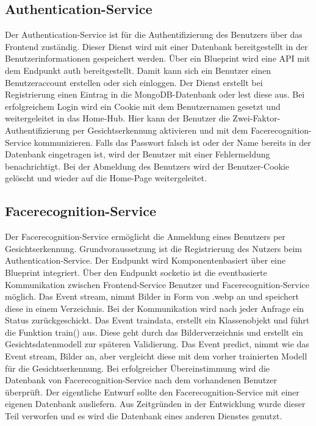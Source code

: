\subsection{Authentication-Service}
Der Authentication-Service ist für die Authentifizierung des Benutzers über das Frontend zuständig.
Dieser Dienst wird mit einer Datenbank bereitgestellt in der Benutzerinformationen gespeichert werden.
Über ein Blueprint wird eine API mit dem Endpunkt auth bereitgestellt.
Damit kann sich ein Benutzer einen Benutzeraccount erstellen oder sich einloggen.
Der Dienst erstellt bei Registrierung einen Eintrag in die MongoDB-Datenbank oder lest diese aus.
Bei erfolgreichem Login wird ein Cookie mit dem Benutzernamen gesetzt und weitergeleitet in das Home-Hub.
Hier kann der Benutzer die Zwei-Faktor-Authentifizierung per Gesichtserkennung aktivieren und mit dem Facerecognition-Service kommunizieren.
Falls das Passwort falsch ist oder der Name bereits in der Datenbank eingetragen ist, wird der Benutzer mit einer Fehlermeldung benachrichtigt.
Bei der Abmeldung des Benutzers wird der Benutzer-Cookie gelöscht und wieder auf die Home-Page weitergeleitet.


\subsection{Facerecognition-Service}
Der Facerecognition-Service ermöglicht die Anmeldung eines Benutzers per Gesichtserkennung.
Grundvoraussetzung ist die Registrierung des Nutzers beim Authentication-Service.
Der Endpunkt wird Komponentenbasiert über eine Blueprint integriert.
Über den Endpunkt socketio ist die eventbasierte Kommunikation zwischen Frontend-Service Benutzer und Facerecognition-Service möglich.
Das Event stream, nimmt Bilder in Form von .webp an und speichert diese in einem Verzeichnis.
Bei der Kommunikation wird nach jeder Anfrage ein Status zurückgeschickt.
Das Event traindata, erstellt ein Klassenobjekt und führt die Funktion train() aus.
Diese geht durch das Bilderverzeichnis und erstellt ein Gesichtsdatenmodell zur späteren Validierung.
Das Event predict, nimmt wie das Event stream, Bilder an, aber vergleicht diese mit dem vorher trainierten Modell für die Gesichtserkennung.
Bei erfolgreicher Übereinstimmung wird die Datenbank von Facerecognition-Service nach dem vorhandenen Benutzer überprüft.
Der eigentliche Entwurf sollte den Facerecognition-Service mit einer eigenen Datenbank ausliefern.
Aus Zeitgründen in der Entwicklung wurde dieser Teil verworfen und es wird die Datenbank eines anderen Dienstes genutzt.


